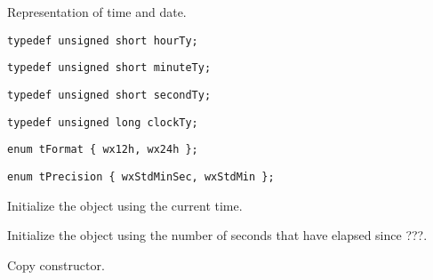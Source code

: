 \section{}\label{wxtime}

Representation of time and date.




{\small \begin{verbatim}
typedef unsigned short hourTy;
\end{verbatim}}

{\small \begin{verbatim}
typedef unsigned short minuteTy;
\end{verbatim}}

{\small \begin{verbatim}
typedef unsigned short secondTy;
\end{verbatim}}

{\small \begin{verbatim}
typedef unsigned long clockTy;
\end{verbatim}}

{\small \begin{verbatim}
enum tFormat { wx12h, wx24h };
\end{verbatim}}

{\small \begin{verbatim}
enum tPrecision { wxStdMinSec, wxStdMin };
\end{verbatim}}




\label{wxtimewxtime}


Initialize the object using the current time.


Initialize the object using the number of seconds that have elapsed since ???.


Copy constructor.


